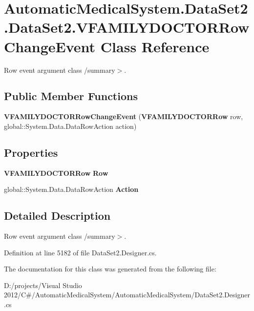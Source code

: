 \section{AutomaticMedicalSystem.DataSet2.DataSet2.VFAMILYDOCTORRowChangeEvent Class Reference}
\label{class_automatic_medical_system_1_1_data_set2_1_1_v_f_a_m_i_l_y_d_o_c_t_o_r_row_change_event}
Row event argument class /summary$>$.  


\subsection*{Public Member Functions}
\begin{CompactItemize}
\item 
\textbf{VFAMILYDOCTORRowChangeEvent} ({\bf VFAMILYDOCTORRow} row, global::System.Data.DataRowAction action)\label{class_automatic_medical_system_1_1_data_set2_1_1_v_f_a_m_i_l_y_d_o_c_t_o_r_row_change_event_81a2b9404312b6bf56cc552af9cda525}

\end{CompactItemize}
\subsection*{Properties}
\begin{CompactItemize}
\item 
{\bf VFAMILYDOCTORRow} \textbf{Row}\hspace{0.3cm}{\tt  [get]}\label{class_automatic_medical_system_1_1_data_set2_1_1_v_f_a_m_i_l_y_d_o_c_t_o_r_row_change_event_129c533c5710438a993c01d8692c8025}

\item 
global::System.Data.DataRowAction \textbf{Action}\hspace{0.3cm}{\tt  [get]}\label{class_automatic_medical_system_1_1_data_set2_1_1_v_f_a_m_i_l_y_d_o_c_t_o_r_row_change_event_782287e20a8ad11c51cf18247a75b963}

\end{CompactItemize}


\subsection{Detailed Description}
Row event argument class /summary$>$. 

Definition at line 5182 of file DataSet2.Designer.cs.

The documentation for this class was generated from the following file:\begin{CompactItemize}
\item 
D:/projects/Visual Studio 2012/C\#/AutomaticMedicalSystem/AutomaticMedicalSystem/DataSet2.Designer.cs\end{CompactItemize}
